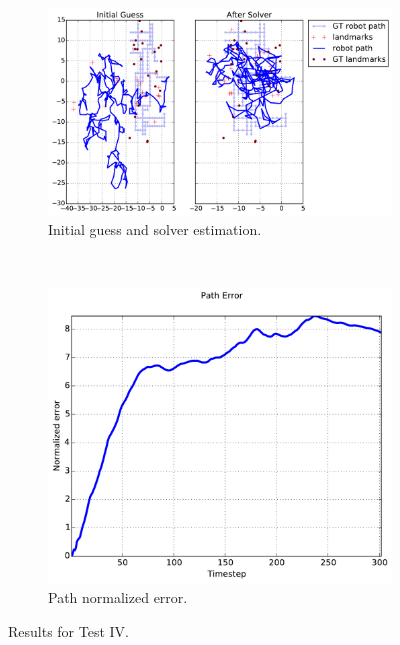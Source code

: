 \begin{figure}[htbp!]
    \centering
    \begin{subfigure}[b]{\estWidth\textwidth}
        \includegraphics[width=\textwidth]{imagenes/tests/known/res_it_20_nl_40_op_1_oa_1_lp_1_ds_300_kw_1.pdf}
        \caption{Initial guess and solver estimation.}
        \label{fig:test-iva}
    \end{subfigure}\\
    \begin{subfigure}[b]{\errorWidth\textwidth}
        \includegraphics[width=\textwidth]{imagenes/tests/known/res_it_20_nl_40_op_1_oa_1_lp_1_ds_300_kw_1_path.pdf}
        \caption{Path normalized error.}
        \label{fig:test-ivb}
    \end{subfigure}
    \caption{Results for Test IV.}
    \label{fig:test-iv}
\end{figure}
\clearpage

